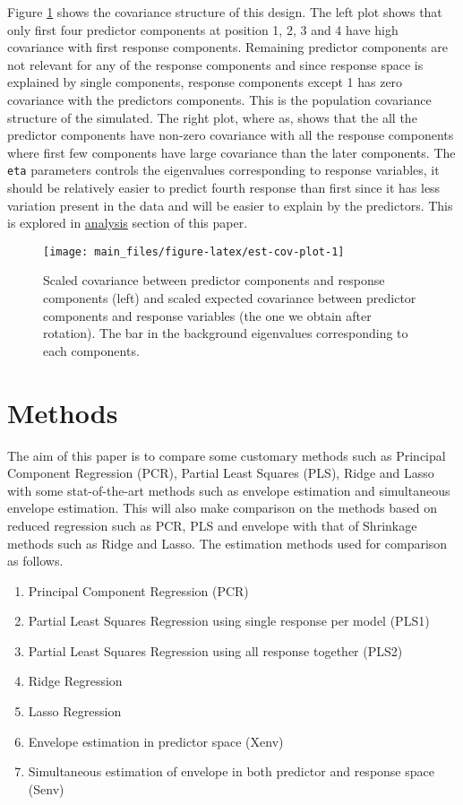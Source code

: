 \documentclass[12pt,3p,authoryear]{elsarticle}
\providecommand{\tightlist}{%
  \setlength{\itemsep}{0pt}\setlength{\parskip}{0pt}}
\begin{document}
Figure \ref{fig:est-cov-plot} shows the covariance structure of this
design. The left plot shows that only first four predictor components at
position 1, 2, 3 and 4 have high covariance with first response
components. Remaining predictor components are not relevant for any of
the response components and since response space is explained by single
components, response components except 1 has zero covariance with the
predictors components. This is the population covariance structure of
the simulated. The right plot, where as, shows that the all the
predictor components have non-zero covariance with all the response
components where first few components have large covariance than the
later components. The \texttt{eta} parameters controls the eigenvalues
corresponding to response variables, it should be relatively easier to
predict fourth response than first since it has less variation present
in the data and will be easier to explain by the predictors. This is
explored in \protect\hyperlink{analysis}{analysis} section of this
paper.

\begin{figure}
\texttt{[image: main\_files/figure-latex/est-cov-plot-1]} \caption{Scaled covariance between predictor components and response components (left) and scaled expected covariance between predictor components and response variables (the one we obtain after rotation). The bar in the background eigenvalues corresponding to each components.}\label{fig:est-cov-plot}
\end{figure}

\hypertarget{methods}{\section{Methods}\label{methods}}

The aim of this paper is to compare some customary methods such as
Principal Component Regression (PCR), Partial Least Squares (PLS), Ridge
and Lasso with some stat-of-the-art methods such as envelope estimation
and simultaneous envelope estimation. This will also make comparison on
the methods based on reduced regression such as PCR, PLS and envelope
with that of Shrinkage methods such as Ridge and Lasso. The estimation
methods used for comparison as follows.

\begin{enumerate}
\def\labelenumi{\alph{enumi})}
\tightlist
\item
  Principal Component Regression (PCR)
\item
  Partial Least Squares Regression using single response per model
  (PLS1)
\item
  Partial Least Squares Regression using all response together (PLS2)
\item
  Ridge Regression
\item
  Lasso Regression
\item
  Envelope estimation in predictor space
  (Xenv)\citep{cook2015foundations}
\item
  Simultaneous estimation of envelope in both predictor and response
  space (Senv)\citep{cook2015simultaneous}
\end{enumerate}
\end{document}
